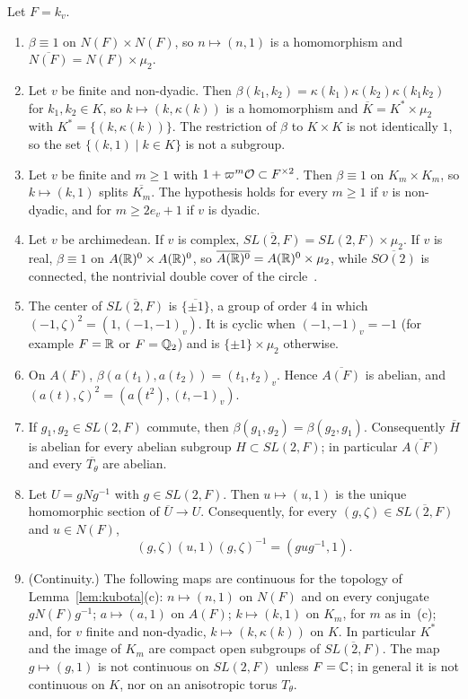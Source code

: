 \begin{lemma}\label{lem:local}
Let $F=k_v$.
\begin{enumerate}[label=(\alph*)]
\item $\beta\equiv1$ on $N(F)\times N(F)$, so $n\mapsto(n,1)$ is a
  homomorphism and $\overline{N(F)}=N(F)\times\mu_2$.
\item Let $v$ be finite and non-dyadic. Then $\beta(k_1,k_2)=
  \kappa(k_1)\kappa(k_2)\kappa(k_1k_2)$ for $k_1,k_2\in K$, so
  $k\mapsto(k,\kappa(k))$ is a homomorphism and
  $\overline K=K^*\times\mu_2$ with $K^*=\{(k,\kappa(k))\}$. The
  restriction of $\beta$ to $K\times K$ is not identically $1$, so the
  set $\{(k,1)\mid k\in K\}$ is not a subgroup.
\item Let $v$ be finite and $m\ge1$ with $1+\varpi^m\mathcal{O}\subset
  F^{\times2}$. Then $\beta\equiv1$ on $K_m\times K_m$, so
  $k\mapsto(k,1)$ splits $\overline{K_m}$. The hypothesis holds for every
  $m\ge1$ if $v$ is non-dyadic, and for $m\ge 2e_v+1$ if $v$ is dyadic.
\item Let $v$ be archimedean. If $v$ is complex,
  $\overline{SL(2,F)}=SL(2,F)\times\mu_2$. If $v$ is real, $\beta\equiv1$
  on $A(\mathbb{R})^0\times A(\mathbb{R})^0$, so $\overline{A(\mathbb{R})^0}=A(\mathbb{R})^0\times\mu_2$,
  while $\overline{SO(2)}$ is connected, the nontrivial double cover of
  the circle~\cite{Ge76}.
\item The center of $\overline{SL(2,F)}$ is $\overline{\{\pm1\}}$, a
  group of order $4$ in which $(-1,\zeta)^2=(1,(-1,-1)_v)$. It is cyclic
  when $(-1,-1)_v=-1$ (for example $F=\mathbb{R}$ or $F=\mathbb{Q}_2$) and is
  $\{\pm1\}\times\mu_2$ otherwise.
\item On $A(F)$, $\beta(a(t_1),a(t_2))=(t_1,t_2)_v$. Hence
  $\overline{A(F)}$ is abelian, and
  $(a(t),\zeta)^2=(a(t^2),(t,-1)_v)$.
\item If $g_1,g_2\in SL(2,F)$ commute, then $\beta(g_1,g_2)=
  \beta(g_2,g_1)$. Consequently $\overline H$ is abelian for every abelian
  subgroup $H\subset SL(2,F)$; in particular $\overline{A(F)}$ and every
  $\overline{T_\theta}$ are abelian.
\item Let $U=gNg^{-1}$ with $g\in SL(2,F)$. Then $u\mapsto(u,1)$ is the
  unique homomorphic section of $\overline U\to U$. Consequently, for every
  $(g,\zeta)\in\overline{SL(2,F)}$ and $u\in N(F)$,
  \[
  (g,\zeta)(u,1)(g,\zeta)^{-1}=(gug^{-1},1).
  \]
\item (Continuity.) The following maps are continuous for the topology
  of Lemma~\ref{lem:kubota}(c): $n\mapsto(n,1)$ on $N(F)$ and on every
  conjugate $gN(F)g^{-1}$; $a\mapsto(a,1)$ on $A(F)$; $k\mapsto(k,1)$ on
  $K_m$, for $m$ as in~(c); and, for $v$ finite and non-dyadic,
  $k\mapsto(k,\kappa(k))$ on $K$. In particular $K^*$ and the image of
  $K_m$ are compact open subgroups of $\overline{SL(2,F)}$. The map
  $g\mapsto(g,1)$ is not continuous on $SL(2,F)$ unless $F=\mathbb{C}$; in general
  it is not continuous on $K$, nor on an anisotropic torus $T_\theta$.
\end{enumerate}
\end{lemma}

